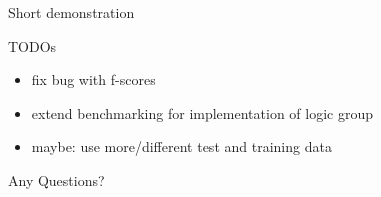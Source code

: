 \documentclass[xcolor=x11names,table]{beamer}
\begin{document}
\begin{frame}{}
\begin{center}
\Huge
Short demonstration
\end{center}
\end{frame}

\begin{frame}{TODOs}
\begin{itemize}
    \item fix bug with f-scores
    \item extend benchmarking for implementation of logic group
    \item maybe: use more\slash{}different test and training data
\end{itemize}
\end{frame}

\begin{frame}{}
\begin{center}
\Huge
Any Questions?
\end{center}
\end{frame}
\end{document}
